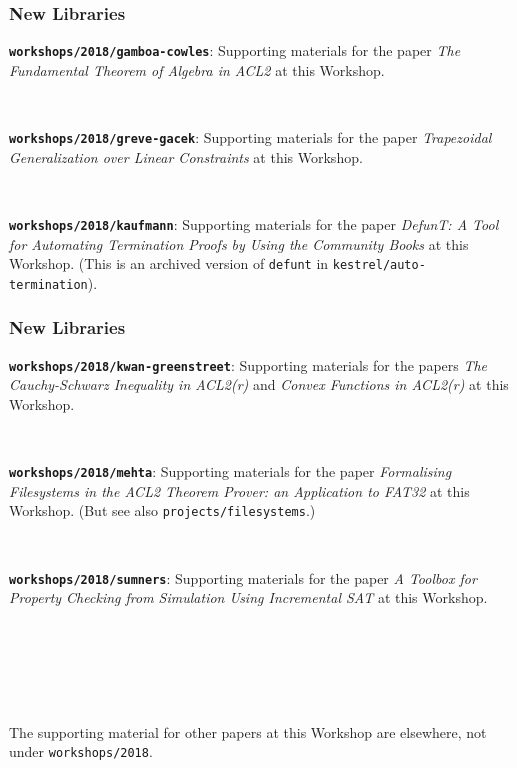 \documentclass{beamer}
\newcommand{\code}[1]{\texttt{#1}}
\newcommand{\bookpath}[1]{\textbf{\code{#1}}}
\newcommand{\newlibtitle}{\frametitle{New Libraries}}
\begin{document}

\begin{frame}

\newlibtitle

\bookpath{workshops/2018/gamboa-cowles}:
Supporting materials for the paper
\textit{The Fundamental Theorem of Algebra in ACL2}
at this Workshop.

\

\bookpath{workshops/2018/greve-gacek}:
Supporting materials for the paper
\textit{Trapezoidal Generalization over Linear Constraints}
at this Workshop.

\

\bookpath{workshops/2018/kaufmann}:
Supporting materials for the paper
\textit{DefunT: A Tool for Automating Termination Proofs
by Using the Community Books}
at this Workshop.
(This is an archived version of
\code{defunt} in \code{kestrel/auto-termination}).

\end{frame}


\begin{frame}

\newlibtitle

\bookpath{workshops/2018/kwan-greenstreet}:
Supporting materials for the papers
\textit{The Cauchy-Schwarz Inequality in ACL2(r)} and
\textit{Convex Functions in ACL2(r)}
at this Workshop.

\

\bookpath{workshops/2018/mehta}:
Supporting materials for the paper
\textit{Formalising Filesystems in the ACL2 Theorem Prover:
an Application to FAT32}
at this Workshop.
(But see also \code{projects/filesystems}.)

\

\bookpath{workshops/2018/sumners}:
Supporting materials for the paper
\textit{A Toolbox for Property Checking from Simulation Using Incremental SAT}
at this Workshop.

\

\

\

The supporting material for other papers at this Workshop
are elsewhere, not under \code{workshops/2018}.

\end{frame}

\end{document}
